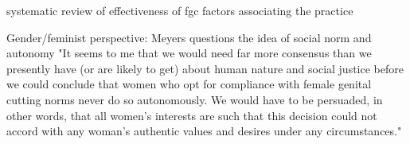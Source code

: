 \documentclass[12pt,]{article}
\newcommand{\comment}[1]{\textbf{[[#1]]}}
\newcommand{\cfcmt}[1]{\comment{CFS: #1}}
\begin{document}





systematic review of effectiveness of fgc factors associating the practice \cite{WaigDoos18}

Gender/feminist perspective:  \cite{Meye00} Meyers questions the idea of social norm and autonomy "It seems to me that we would need far more consensus than we presently have (or are likely to get) about human nature and social justice before we could conclude that women who opt for compliance with female genital cutting norms never do so autonomously.  We would have to be persuaded, in other words, that all women's interests are such that this decision could not accord with any woman's authentic values and desires under any circumstances." 
\end{document}
